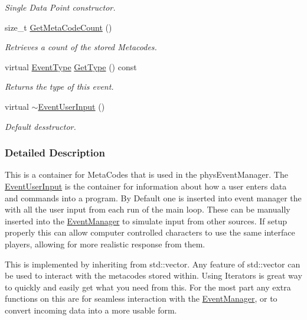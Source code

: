 \begin{DoxyCompactItemize}
\begin{DoxyCompactList}\small\item\em Single Data Point constructor. \item\end{DoxyCompactList}\item 
size\_\-t \hyperlink{classphys_1_1EventUserInput_ae7964b1ac3a474415d6f6cf6c26a2f7b}{GetMetaCodeCount} ()
\begin{DoxyCompactList}\small\item\em Retrieves a count of the stored Metacodes. \item\end{DoxyCompactList}\item 
virtual \hyperlink{classphys_1_1EventBase_a5e6a8564e127f654123f0bf6a2751923}{EventType} \hyperlink{classphys_1_1EventUserInput_a3e803a8d9bcc1576fe04d2245a86ec80}{GetType} () const 
\begin{DoxyCompactList}\small\item\em Returns the type of this event. \item\end{DoxyCompactList}\item 
virtual \hyperlink{classphys_1_1EventUserInput_a5c4bb6a5016dad4cb32f51cc1d88eac3}{$\sim$EventUserInput} ()
\begin{DoxyCompactList}\small\item\em Default desstructor. \item\end{DoxyCompactList}\end{DoxyCompactItemize}


\subsubsection{Detailed Description}
This is a container for MetaCodes that is used in the physEventManager. The \hyperlink{classphys_1_1EventUserInput}{EventUserInput} is the container for information about how a user enters data and commands into a program. By Default one is inserted into event manager the with all the user input from each run of the main loop. These can be manually inserted into the \hyperlink{classphys_1_1EventManager}{EventManager} to simulate input from other sources. If setup properly this can allow computer controlled characters to use the same interface players, allowing for more realistic response from them. \par
 \par
 This is implemented by inheriting from std::vector. Any feature of std::vector can be used to interact with the metacodes stored within. Using Iterators is great way to quickly and easily get what you need from this. For the most part any extra functions on this are for seamless interaction with the \hyperlink{classphys_1_1EventManager}{EventManager}, or to convert incoming data into a more usable form. 

